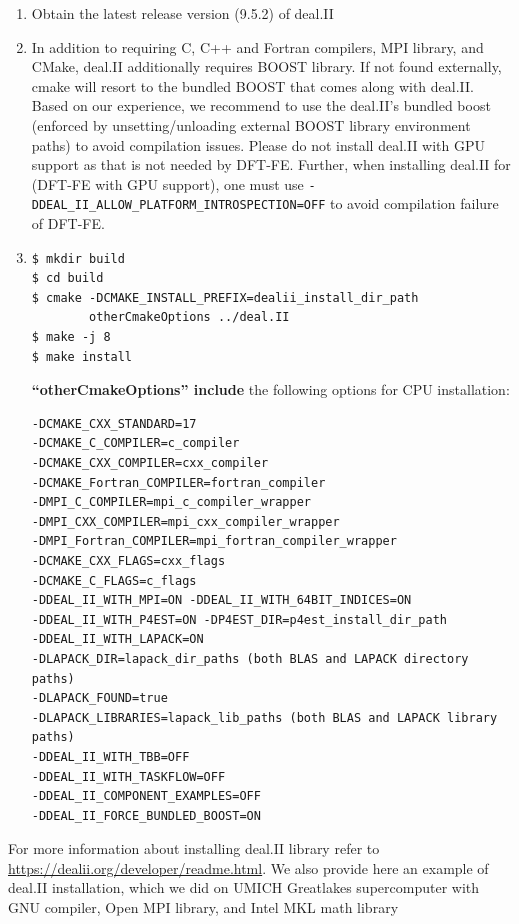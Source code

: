 \begin{enumerate}

\item Obtain the latest release version (9.5.2) of deal.II

\item In addition to requiring C, C++ and Fortran compilers, MPI library, and CMake, deal.II additionally requires BOOST library. If not found externally, cmake will resort to the bundled BOOST that comes along with deal.II. Based on our experience, we recommend to use the deal.II's bundled boost (enforced by unsetting/unloading external BOOST library environment paths) to avoid compilation issues. Please do not install deal.II with GPU support as that is not needed by DFT-FE. Further, when installing deal.II for (DFT-FE with GPU support), one must use \verb|-DDEAL_II_ALLOW_PLATFORM_INTROSPECTION=OFF| to avoid compilation failure of DFT-FE.

\item
\begin{verbatim}
$ mkdir build
$ cd build
$ cmake -DCMAKE_INSTALL_PREFIX=dealii_install_dir_path
        otherCmakeOptions ../deal.II
$ make -j 8        
$ make install
\end{verbatim}
{\bf ``otherCmakeOptions'' include} the following options for CPU installation:
\begin{verbatim}
-DCMAKE_CXX_STANDARD=17
-DCMAKE_C_COMPILER=c_compiler
-DCMAKE_CXX_COMPILER=cxx_compiler
-DCMAKE_Fortran_COMPILER=fortran_compiler
-DMPI_C_COMPILER=mpi_c_compiler_wrapper
-DMPI_CXX_COMPILER=mpi_cxx_compiler_wrapper
-DMPI_Fortran_COMPILER=mpi_fortran_compiler_wrapper
-DCMAKE_CXX_FLAGS=cxx_flags
-DCMAKE_C_FLAGS=c_flags
-DDEAL_II_WITH_MPI=ON -DDEAL_II_WITH_64BIT_INDICES=ON
-DDEAL_II_WITH_P4EST=ON -DP4EST_DIR=p4est_install_dir_path
-DDEAL_II_WITH_LAPACK=ON
-DLAPACK_DIR=lapack_dir_paths (both BLAS and LAPACK directory paths)
-DLAPACK_FOUND=true
-DLAPACK_LIBRARIES=lapack_lib_paths (both BLAS and LAPACK library paths)
-DDEAL_II_WITH_TBB=OFF
-DDEAL_II_WITH_TASKFLOW=OFF
-DDEAL_II_COMPONENT_EXAMPLES=OFF
-DDEAL_II_FORCE_BUNDLED_BOOST=ON
\end{verbatim}



\end{enumerate}	
 For more information about installing deal.II library refer to \url{https://dealii.org/developer/readme.html}. We also provide here an example of deal.II installation, which we did on UMICH Greatlakes supercomputer with GNU compiler, Open MPI library, and Intel MKL math library
